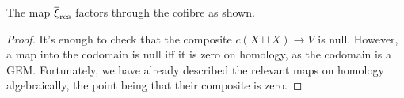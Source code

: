 \documentclass[10pt]{article}
\begin{document}
\begin{Adams Muliplicativity}
\begin{lem}
The map $\overline{\xi}_\textup{res}$ factors through the cofibre as shown.
\end{lem}
\begin{proof}
It's enough to check that the composite $c(X\sqcup X)\to  V$ is null. However, a map into the codomain is null iff it is zero on homology, as the codomain is a GEM. Fortunately, we have already described the relevant maps on homology algebraically, the point being that their composite is zero.
\end{proof}



\end{Adams Muliplicativity}
\end{document}

